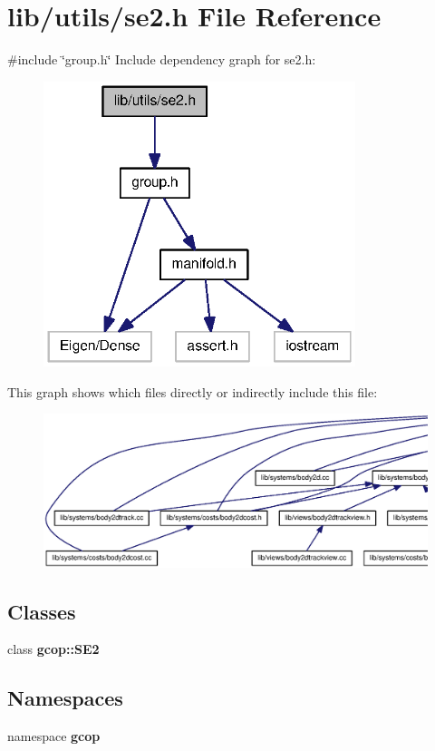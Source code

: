 \section{lib/utils/se2.h \-File \-Reference}
\label{se2_8h}
{\ttfamily \#include \char`\"{}group.\-h\char`\"{}}\*
\-Include dependency graph for se2.\-h\-:
\nopagebreak
\begin{figure}[H]
\begin{center}
\leavevmode
\includegraphics[width=258pt]{se2_8h__incl}
\end{center}
\end{figure}
\-This graph shows which files directly or indirectly include this file\-:
\nopagebreak
\begin{figure}[H]
\begin{center}
\leavevmode
\includegraphics[width=350pt]{se2_8h__dep__incl}
\end{center}
\end{figure}
\subsection*{\-Classes}
\begin{DoxyCompactItemize}
\item 
class {\bf gcop\-::\-S\-E2}
\end{DoxyCompactItemize}
\subsection*{\-Namespaces}
\begin{DoxyCompactItemize}
\item 
namespace {\bf gcop}
\end{DoxyCompactItemize}
